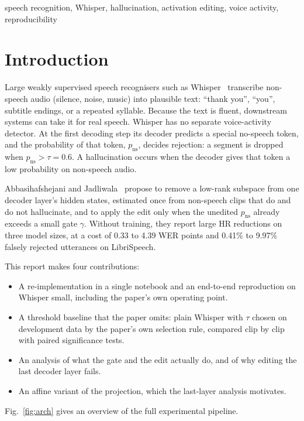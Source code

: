 \documentclass[conference,a4paper]{IEEEtran}
\newcommand{\pns}{p_{\mathrm{ns}}}
\begin{document}
\begin{IEEEkeywords}
speech recognition, Whisper, hallucination, activation editing, voice activity, reproducibility
\end{IEEEkeywords}

\section{Introduction}

Large weakly supervised speech recognisers such as Whisper~\cite{radford2023whisper} transcribe non-speech audio (silence, noise, music) into plausible text: ``thank you'', ``you'', subtitle endings, or a repeated syllable. Because the text is fluent, downstream systems can take it for real speech. Whisper has no separate voice-activity detector. At the first decoding step its decoder predicts a special no-speech token, and the probability of that token, $\pns$, decides rejection: a segment is dropped when $\pns > \tau = 0.6$. A hallucination occurs when the decoder gives that token a low probability on non-speech audio.

Abbasihafshejani and Jadliwala~\cite{abbasi2026hsp} propose to remove a low-rank subspace from one decoder layer's hidden states, estimated once from non-speech clips that do and do not hallucinate, and to apply the edit only when the unedited $\pns$ already exceeds a small gate $\gamma$. Without training, they report large HR reductions on three model sizes, at a cost of 0.33 to 4.39 WER points and 0.41\% to 9.97\% falsely rejected utterances on LibriSpeech.

This report makes four contributions:
\begin{itemize}
\item A re-implementation in a single notebook and an end-to-end reproduction on Whisper small, including the paper's own operating point.
\item A threshold baseline that the paper omits: plain Whisper with $\tau$ chosen on development data by the paper's own selection rule, compared clip by clip with paired significance tests.
\item An analysis of what the gate and the edit actually do, and of why editing the last decoder layer fails.
\item An affine variant of the projection, which the last-layer analysis motivates.
\end{itemize}
Fig.~\ref{fig:arch} gives an overview of the full experimental pipeline.
\end{document}

